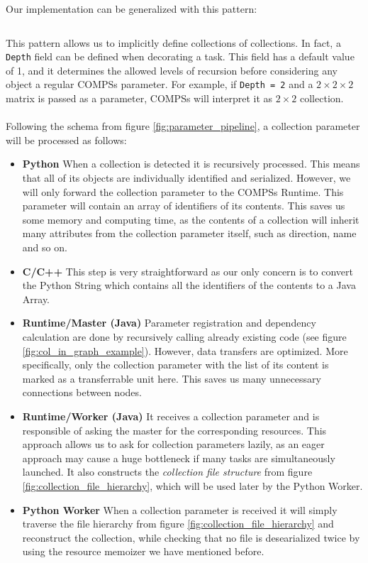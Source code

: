 Our implementation can be generalized with this pattern:

\inputminted{python}{snippets/collection_pattern.py}

This pattern allows us to implicitly define collections of collections. In fact, a \verb|Depth| field can be defined when decorating a task. This field has a default value of 1, and it determines the allowed levels of recursion before considering any object a regular COMPSs parameter. For example, if \verb|Depth = 2| and a $2 \times 2 \times 2$ matrix is passed as a parameter, COMPSs will interpret it as $2 \times 2$ collection.\\
\\
Following the schema from figure \ref{fig:parameter_pipeline}, a collection parameter will be processed as follows:
\begin{itemize}
    \item \textbf{Python} When a collection is detected it is recursively processed. This means that all of its objects are individually identified and serialized. However, we will only forward the collection parameter to the COMPSs Runtime. This parameter will contain an array of identifiers of its contents. This saves us some memory and computing time, as the contents of a collection will inherit many attributes from the collection parameter itself, such as direction, name and so on.
    \item \textbf{C/C++} This step is very straightforward as our only concern is to convert the Python String which contains all the identifiers of the contents to a Java Array.
    \item \textbf{Runtime/Master (Java)} Parameter registration and dependency calculation are done by recursively calling already existing code (see figure \ref{fig:col_in_graph_example}). However, data transfers are optimized. More specifically, only the collection parameter with the list of its content is marked as a transferrable unit here. This saves us many unnecessary connections between nodes.
    \item \textbf{Runtime/Worker (Java)} It receives a collection parameter and is responsible of asking the master for the corresponding resources. This approach allows us to ask for collection parameters lazily, as an eager approach may cause a huge bottleneck if many tasks are simultaneously launched. It also constructs the \textit{collection file structure} from figure \ref{fig:collection_file_hierarchy}, which will be used later by the Python Worker.
    \item \textbf{Python Worker} When a collection parameter is received it will simply traverse the file hierarchy from figure \ref{fig:collection_file_hierarchy} and reconstruct the collection, while checking that no file is desearialized twice by using the resource memoizer we have mentioned before.
\end{itemize}


